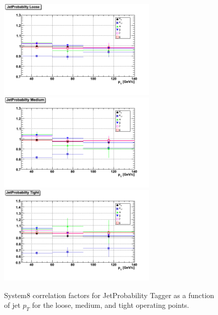 \begin{figure}[htbp]
  \begin{center}
    \includegraphics[width=75mm]{Figures/JPL_correlations_ppmux.png}
    \includegraphics[width=75mm]{Figures/JPM_correlations_ppmux.png}
    \includegraphics[width=75mm]{Figures/JPT_correlations_ppmux.png}
  \end{center}
  \caption{System8 correlation factors for JetProbability Tagger as a function
of jet $p_T $ for the loose, medium, and tight operating points.}
  \label{fig:correlation_TP}
\end{figure}


